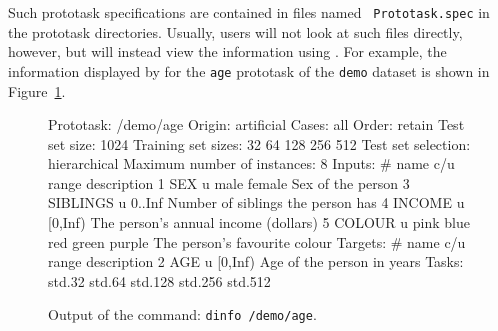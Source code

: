 Such prototask specifications are contained in files named {\tt
Prototask.spec} in the prototask directories.  Usually, users will not
look at such files directly, however, but will instead view the
information using \dinfo{}.  For example, the information displayed by
\dinfo{} for the \texttt{age} prototask of the \texttt{demo} dataset
is shown in Figure~\ref{fig:task-dinfo}.

\begin{figure}[t]
\begin{Session}
Prototask: /demo/age
Origin: artificial
Cases: all
Order: retain
Test set size: 1024
Training set sizes: 32 64 128 256 512
Test set selection: hierarchical
Maximum number of instances: 8
Inputs: 
     #  name     c/u range        description
     1  SEX       u  male female  Sex of the person
     3  SIBLINGS  u  0..Inf       Number of siblings the person has
     4  INCOME    u  [0,Inf)      The person's annual income (dollars)
     5  COLOUR    u  pink blue red green purple 
                                  The person's favourite colour
Targets: 
     #  name     c/u range        description
     2  AGE       u  [0,Inf)      Age of the person in years
Tasks: 
        std.32
        std.64
        std.128
        std.256
        std.512
\end{Session}\vspace{-4pt}
\caption{Output of the command: \texttt{dinfo /demo/age}.}
\label{fig:task-dinfo}
\end{figure}


